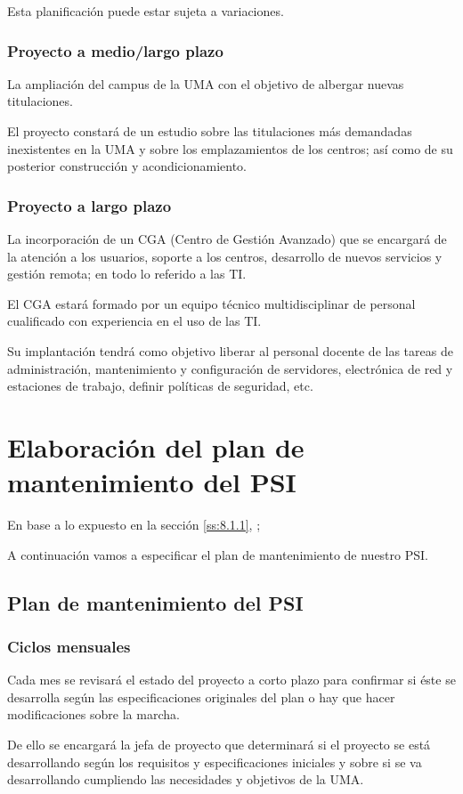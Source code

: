 \documentclass[11pt,a4paper,spanish,twoside]{book}
\begin{document}
Esta planificación puede estar sujeta a variaciones.

\subsubsection{Proyecto a medio/largo plazo}
La ampliación del campus de la UMA con el objetivo de albergar nuevas 
titulaciones.

El proyecto constará de un estudio sobre las titulaciones más demandadas 
inexistentes en la UMA y sobre los emplazamientos de los centros; así
como de su posterior construcción y acondicionamiento.

\subsubsection{Proyecto a largo plazo}
La incorporación de un CGA (Centro de Gestión Avanzado) que se encargará de la
atención a los usuarios, soporte a los centros, desarrollo de nuevos servicios 
y gestión remota; en todo lo referido a las TI.

El CGA estará formado por un equipo técnico multidisciplinar de personal 
cualificado con experiencia en el uso de las TI.

Su implantación tendrá como objetivo liberar al personal docente de las tareas 
de administración, mantenimiento y configuración de servidores, electrónica de 
red y estaciones de trabajo, definir políticas de seguridad, etc.

\section{Elaboración del plan de mantenimiento del PSI}
En base a lo expuesto
en la sección \vref{ss:8.1.1}, \emph{}; 

A continuación vamos a especificar el plan de mantenimiento de nuestro PSI.
\subsection{Plan de mantenimiento del PSI}
\subsubsection{Ciclos mensuales}
Cada mes se revisará el estado del proyecto a corto plazo para confirmar si 
éste se desarrolla según las especificaciones originales del plan o hay que 
hacer modificaciones sobre la marcha.

De ello se encargará la jefa de proyecto que determinará si el proyecto se está
desarrollando según los requisitos y especificaciones iniciales y sobre si se 
va desarrollando cumpliendo las necesidades y objetivos de la UMA.
\end{document}
